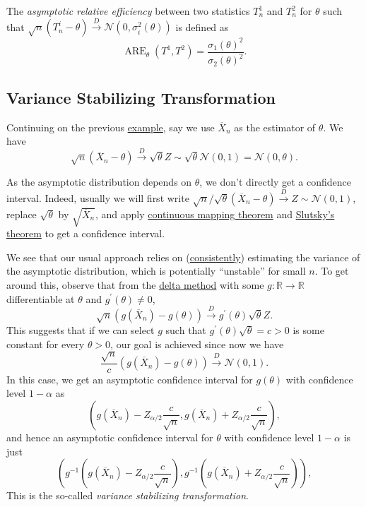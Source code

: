 \begin{definition}\label{def:asymptotic-relative-efficiency}
	The \emph{asymptotic relative efficiency} between two statistics \(T^1_n\) and \(T^2_n\) for \(\theta \) such that \(\sqrt{n} (T_n^i - \theta ) \overset{D}{\to} \mathcal{N} (0, \sigma _i^2(\theta ))\) is defined as
	\[
		\operatorname{ARE}_\theta (T^1, T^2) = \frac{\sigma _1(\theta )^2}{\sigma _2(\theta )^2}.
	\]
\end{definition}

\subsection{Variance Stabilizing Transformation}
Continuing on the previous \hyperref[eg:ARE]{example}, say we use \(\overline{X} _n\) as the estimator of \(\theta \). We have
\[
	\sqrt{n} (\overline{X} _n - \theta ) \overset{D}{\to} \sqrt{\theta } Z \sim \sqrt{\theta } \mathcal{N} (0, 1) = \mathcal{N} (0, \theta ) .
\]

\begin{prev}
	As the asymptotic distribution depends on \(\theta \), we don't directly get a confidence interval. Indeed, usually we will first write \(\sqrt{n} / \sqrt{\theta } (\overline{X} _n - \theta ) \overset{D}{\to} Z \sim \mathcal{N} (0, 1)\), replace \(\sqrt{\theta } \) by \(\sqrt{\overline{X} _n} \), and apply \hyperref[thm:continuous-mapping]{continuous mapping theorem} and \hyperref[thm:Slutsky]{Slutsky's theorem} to get a confidence interval.
\end{prev}

We see that our usual approach relies on (\hyperref[def:consistent]{consistently}) estimating the variance of the asymptotic distribution, which is potentially ``unstable'' for small \(n\). To get around this, observe that from the \hyperref[thm:delta-method]{delta method} with some \(g \colon \mathbb{R} \to \mathbb{R} \) differentiable at \(\theta \) and \(g^{\prime} (\theta ) \neq 0\),
\[
	\sqrt{n} (g(\overline{X} _n) - g(\theta )) \overset{D}{\to} g^{\prime} (\theta ) \sqrt{\theta } Z.
\]
This suggests that if we can select \(g\) such that \(g^{\prime} (\theta ) \sqrt{\theta } = c > 0\) is some constant for every \(\theta > 0\), our goal is achieved since now we have
\[
	\frac{\sqrt{n}}{c} (g(\overline{X} _n) - g(\theta )) \overset{D}{\to} \mathcal{N} (0, 1).
\]
In this case, we get an asymptotic confidence interval for \(g(\theta )\) with confidence level \(1 - \alpha \) as
\[
	\left( g(\overline{X} _n) - Z_{\alpha / 2} \frac{c}{\sqrt{n} } , g(\overline{X} _n) + Z_{\alpha / 2} \frac{c}{\sqrt{n} } \right),
\]
and hence an asymptotic confidence interval for \(\theta \) with confidence level \(1 - \alpha \) is just
\[
	\left( g^{-1} \left( g(\overline{X} _n) - Z_{\alpha / 2} \frac{c}{\sqrt{n} } \right) , g^{-1} \left( g(\overline{X} _n) + Z_{\alpha / 2} \frac{c}{\sqrt{n} } \right) \right),
\]
This is the so-called \emph{variance stabilizing transformation}.

